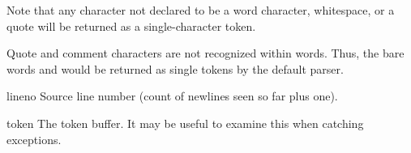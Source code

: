 Note that any character not declared to be a word character,
whitespace, or a quote will be returned as a single-character token.

Quote and comment characters are not recognized within words.  Thus,
the bare words  and  would be returned as single
tokens by the default parser.

\begin{memberdesc}{lineno}
Source line number (count of newlines seen so far plus one).
\end{memberdesc}

\begin{memberdesc}{token}
The token buffer.  It may be useful to examine this when catching
exceptions.
\end{memberdesc}
